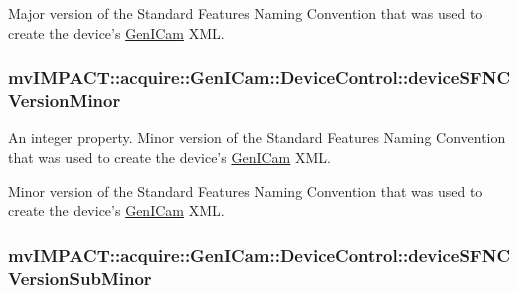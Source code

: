 Major version of the Standard Features Naming Convention that was used to create the device's \hyperlink{namespacemv_i_m_p_a_c_t_1_1acquire_1_1_gen_i_cam}{Gen\+I\+Cam} X\+M\+L. \hypertarget{classmv_i_m_p_a_c_t_1_1acquire_1_1_gen_i_cam_1_1_device_control_a941693542bcc2cda87f52d489e69c09c}{
\subsubsection[{device\+S\+F\+N\+C\+Version\+Minor}]{ mv\+I\+M\+P\+A\+C\+T\+::acquire\+::\+Gen\+I\+Cam\+::\+Device\+Control\+::device\+S\+F\+N\+C\+Version\+Minor}}\label{classmv_i_m_p_a_c_t_1_1acquire_1_1_gen_i_cam_1_1_device_control_a941693542bcc2cda87f52d489e69c09c}


An integer property. Minor version of the Standard Features Naming Convention that was used to create the device's \hyperlink{namespacemv_i_m_p_a_c_t_1_1acquire_1_1_gen_i_cam}{Gen\+I\+Cam} X\+M\+L. 

Minor version of the Standard Features Naming Convention that was used to create the device's \hyperlink{namespacemv_i_m_p_a_c_t_1_1acquire_1_1_gen_i_cam}{Gen\+I\+Cam} X\+M\+L. \hypertarget{classmv_i_m_p_a_c_t_1_1acquire_1_1_gen_i_cam_1_1_device_control_a52d3bba7af5d4b694c7ae5ac0fb3d520}{
\subsubsection[{device\+S\+F\+N\+C\+Version\+Sub\+Minor}]{ mv\+I\+M\+P\+A\+C\+T\+::acquire\+::\+Gen\+I\+Cam\+::\+Device\+Control\+::device\+S\+F\+N\+C\+Version\+Sub\+Minor}}\label{classmv_i_m_p_a_c_t_1_1acquire_1_1_gen_i_cam_1_1_device_control_a52d3bba7af5d4b694c7ae5ac0fb3d520}


